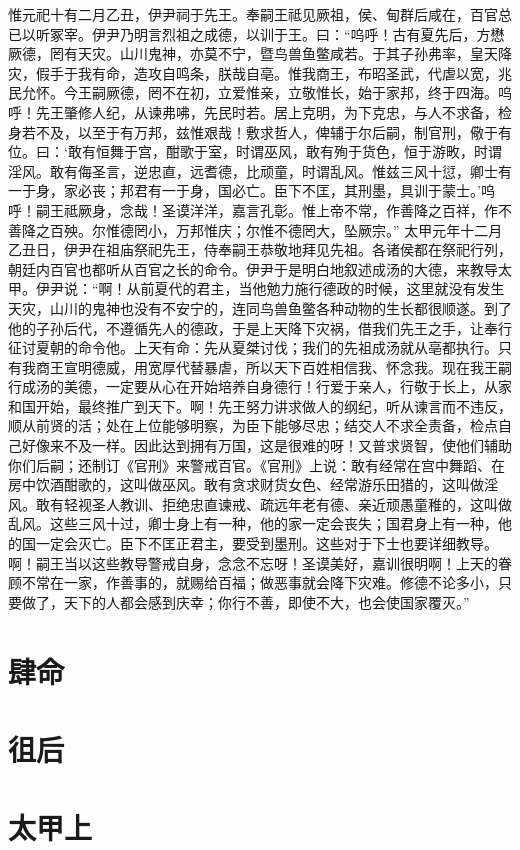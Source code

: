\documentclass[a4paper,12pt,UTF8,twoside]{ctexbook}
\begin{document}
惟元祀十有二月乙丑，伊尹祠于先王。奉嗣王祗见厥祖，侯、甸群后咸在，百官总已以听冢宰。伊尹乃明言烈祖之成德，以训于王。曰：“呜呼！古有夏先后，方懋厥德，罔有天灾。山川鬼神，亦莫不宁，暨鸟兽鱼鳖咸若。于其子孙弗率，皇天降灾，假手于我有命，造攻自鸣条，朕哉自亳。惟我商王，布昭圣武，代虐以宽，兆民允怀。今王嗣厥德，罔不在初，立爱惟亲，立敬惟长，始于家邦，终于四海。呜呼！先王肇修人纪，从谏弗咈，先民时若。居上克明，为下克忠，与人不求备，检身若不及，以至于有万邦，兹惟艰哉！敷求哲人，俾辅于尔后嗣，制官刑，儆于有位。曰：‘敢有恒舞于宫，酣歌于室，时谓巫风，敢有殉于货色，恒于游畋，时谓淫风。敢有侮圣言，逆忠直，远耆德，比顽童，时谓乱风。惟兹三风十愆，卿士有一于身，家必丧；邦君有一于身，国必亡。臣下不匡，其刑墨，具训于蒙士。’呜呼！嗣王祗厥身，念哉！圣谟洋洋，嘉言孔彰。惟上帝不常，作善降之百祥，作不善降之百殃。尔惟德罔小，万邦惟庆；尔惟不德罔大，坠厥宗。”
太甲元年十二月乙丑日，伊尹在祖庙祭祀先王，侍奉嗣王恭敬地拜见先祖。各诸侯都在祭祀行列，朝廷内百官也都听从百官之长的命令。伊尹于是明白地叙述成汤的大德，来教导太甲。伊尹说：“啊！从前夏代的君主，当他勉力施行德政的时候，这里就没有发生天灾，山川的鬼神也没有不安宁的，连同鸟兽鱼鳖各种动物的生长都很顺遂。到了他的子孙后代，不遵循先人的德政，于是上天降下灾祸，借我们先王之手，让奉行征讨夏朝的命令他。上天有命：先从夏桀讨伐；我们的先祖成汤就从亳都执行。只有我商王宣明德威，用宽厚代替暴虐，所以天下百姓相信我、怀念我。现在我王嗣行成汤的美德，一定要从心在开始培养自身德行！行爱于亲人，行敬于长上，从家和国开始，最终推广到天下。啊！先王努力讲求做人的纲纪，听从谏言而不违反，顺从前贤的活；处在上位能够明察，为臣下能够尽忠；结交人不求全责备，检点自己好像来不及一样。因此达到拥有万国，这是很难的呀！又普求贤智，使他们辅助你们后嗣；还制订《官刑》来警戒百官。《官刑》上说：敢有经常在宫中舞蹈、在房中饮酒酣歌的，这叫做巫风。敢有贪求财货女色、经常游乐田猎的，这叫做淫风。敢有轻视圣人教训、拒绝忠直谏戒、疏远年老有德、亲近顽愚童稚的，这叫做乱风。这些三风十过，卿士身上有一种，他的家一定会丧失；国君身上有一种，他的国一定会灭亡。臣下不匡正君主，要受到墨刑。这些对于下士也要详细教导。啊！嗣王当以这些教导警戒自身，念念不忘呀！圣谟美好，嘉训很明啊！上天的眷顾不常在一家，作善事的，就赐给百福；做恶事就会降下灾难。修德不论多小，只要做了，天下的人都会感到庆幸；你行不善，即使不大，也会使国家覆灭。”
\chapter{肆命}
\chapter{徂后}
\chapter{太甲上}
\end{document}
